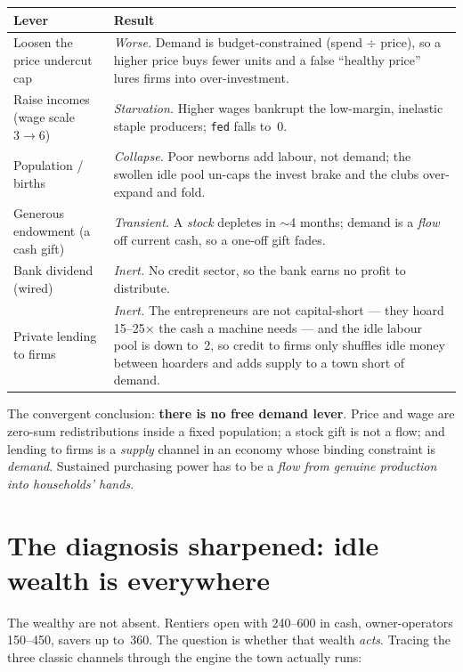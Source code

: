 \documentclass[11pt]{article}
\begin{document}
\begin{center}
\begin{tabular}{@{}lp{9.2cm}@{}}
\toprule
\textbf{Lever} & \textbf{Result} \\
\midrule
Loosen the price undercut cap & \emph{Worse.} Demand is budget-constrained
(spend $\div$ price), so a higher price buys fewer units and a false ``healthy
price'' lures firms into over-investment. \\
Raise incomes (wage scale $3\!\to\!6$) & \emph{Starvation.} Higher wages
bankrupt the low-margin, inelastic staple producers; \texttt{fed} falls to~0. \\
Population / births & \emph{Collapse.} Poor newborns add labour, not demand; the
swollen idle pool un-caps the invest brake and the clubs over-expand and fold. \\
Generous endowment (a cash gift) & \emph{Transient.} A \emph{stock} depletes in
$\sim$4 months; demand is a \emph{flow} off current cash, so a one-off gift
fades. \\
Bank dividend (wired) & \emph{Inert.} No credit sector, so the bank earns no
profit to distribute. \\
Private lending to firms & \emph{Inert.} The entrepreneurs are not capital-short
--- they hoard 15--25$\times$ the cash a machine needs --- and the idle labour
pool is down to~2, so credit to firms only shuffles idle money between hoarders
and adds supply to a town short of demand. \\
\bottomrule
\end{tabular}
\end{center}

\medskip
The convergent conclusion: \textbf{there is no free demand lever}. Price and wage
are zero-sum redistributions inside a fixed population; a stock gift is not a
flow; and lending to firms is a \emph{supply} channel in an economy whose
binding constraint is \emph{demand}. Sustained purchasing power has to be a
\emph{flow from genuine production into households' hands}.

\section{The diagnosis sharpened: idle wealth is everywhere}

The wealthy are not absent. Rentiers open with 240--600 in cash, owner-operators
150--450, savers up to~360. The question is whether that wealth \emph{acts}.
Tracing the three classic channels through the engine the town actually runs:
\end{document}
